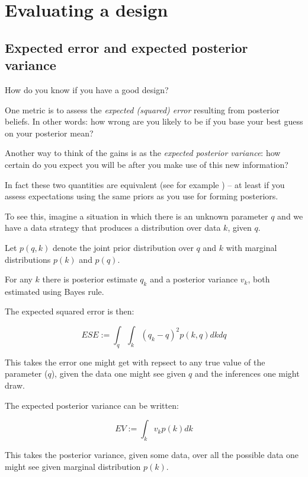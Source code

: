 \documentclass[
  12pt,
]{book}
\begin{document}
\hypertarget{evaluating-a-design}{%
\section{Evaluating a design}\label{evaluating-a-design}}

\hypertarget{expected-error-and-expected-posterior-variance}{%
\subsection{Expected error and expected posterior variance}\label{expected-error-and-expected-posterior-variance}}

How do you know if you have a good design?

One metric is to assess the \emph{expected (squared) error} resulting from posterior beliefs. In other words: how wrong are you likely to be if you base your best guess on your posterior mean?

Another way to think of the gains is as the \emph{expected posterior variance}: how certain do you expect you will be after you make use of this new information?

In fact these two quantities are equivalent (see for example \citet{scharf1991statistical}) -- at least if you assess expectations using the same priors as you use for forming posteriors.

To see this, imagine a situation in which there is an unknown parameter \(q\) and we have a data strategy that produces a distribution over data \(k\), given \(q\).

Let \(p(q,k)\) denote the joint prior distribution over \(q\) and \(k\) with marginal distributions \(p(k)\) and \(p(q)\).

For any \(k\) there is posterior estimate \(q_k\) and a posterior variance \(v_k\), both estimated using Bayes rule.

The expected squared error is then:

\[ESE := \int_q\int_k \left({q}_k-q\right)^2p(k, q)dkdq \]

This takes the error one might get with repsect to any true value of the parameter (\(q\)), given the data one might see given \(q\) and the inferences one might draw.

The expected posterior variance can be written:

\[EV := \int_k v_k p(k)dk\]

This takes the posterior variance, given some data, over all the possible data one might see given marginal distribution \(p(k)\).
\end{document}
